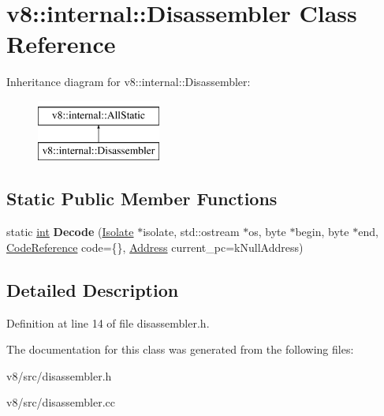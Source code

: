 \hypertarget{classv8_1_1internal_1_1Disassembler}{}\section{v8\+:\+:internal\+:\+:Disassembler Class Reference}
\label{classv8_1_1internal_1_1Disassembler}
Inheritance diagram for v8\+:\+:internal\+:\+:Disassembler\+:\begin{figure}[H]
\begin{center}
\leavevmode
\includegraphics[height=2.000000cm]{classv8_1_1internal_1_1Disassembler}
\end{center}
\end{figure}
\subsection*{Static Public Member Functions}
\begin{DoxyCompactItemize}
\item 
\mbox{\label{classv8_1_1internal_1_1Disassembler_a569717670ddec7562f2b0ce8c25d3be2}} 
static \mbox{\hyperlink{classint}{int}} {\bfseries Decode} (\mbox{\hyperlink{classv8_1_1internal_1_1Isolate}{Isolate}} $\ast$isolate, std\+::ostream $\ast$os, byte $\ast$begin, byte $\ast$end, \mbox{\hyperlink{classv8_1_1internal_1_1CodeReference}{Code\+Reference}} code=\{\}, \mbox{\hyperlink{classuintptr__t}{Address}} current\+\_\+pc=k\+Null\+Address)
\end{DoxyCompactItemize}


\subsection{Detailed Description}


Definition at line 14 of file disassembler.\+h.



The documentation for this class was generated from the following files\+:\begin{DoxyCompactItemize}
\item 
v8/src/disassembler.\+h\item 
v8/src/disassembler.\+cc\end{DoxyCompactItemize}
